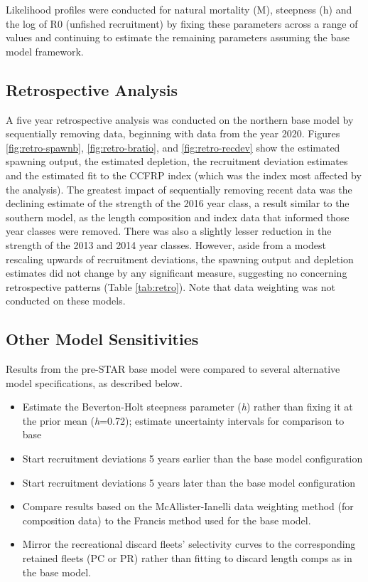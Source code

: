 \documentclass[
  english,
  a4paper,
]{article}
\providecommand{\tightlist}{%
  \setlength{\itemsep}{0pt}\setlength{\parskip}{0pt}}
\begin{document}
Likelihood profiles were conducted for natural mortality (M), steepness (h) and the log of R0 (unfished recruitment) by fixing these parameters across a range of values and continuing to estimate the remaining parameters assuming the base model framework.

\hypertarget{retrospective-analysis}{%
\subsection{Retrospective Analysis}\label{retrospective-analysis}}

A five year retrospective analysis was conducted on the northern base model by sequentially removing data, beginning with data from the year 2020. Figures \ref{fig:retro-spawnb}, \ref{fig:retro-bratio}, and \ref{fig:retro-recdev} show the estimated spawning output, the estimated depletion, the recruitment deviation estimates and the estimated fit to the CCFRP index (which was the index most affected by the analysis). The greatest impact of sequentially removing recent data was the declining estimate of the strength of the 2016 year class, a result similar to the southern model, as the length composition and index data that informed those year classes were removed. There was also a slightly lesser reduction in the strength of the 2013 and 2014 year classes. However, aside from a modest rescaling upwards of recruitment deviations, the spawning output and depletion estimates did not change by any significant measure, suggesting no concerning retrospective patterns (Table \ref{tab:retro}). Note that data weighting was not conducted on these models.

\hypertarget{other-model-sensitivities}{%
\subsection{Other Model Sensitivities}\label{other-model-sensitivities}}

Results from the pre-STAR base model were compared to several alternative model specifications, as described below.

\begin{itemize}
\tightlist
\item
  Estimate the Beverton-Holt steepness parameter (\emph{h}) rather than fixing it at the prior mean (\emph{h}=0.72); estimate uncertainty intervals for comparison to base
\item
  Start recruitment deviations 5 years earlier than the base model configuration
\item
  Start recruitment deviations 5 years later than the base model configuration
\item
  Compare results based on the McAllister-Ianelli data weighting method (for composition data) to the Francis method used for the base model.
\item
  Mirror the recreational discard fleets' selectivity curves to the corresponding retained fleets (PC or PR) rather than fitting to discard length comps as in the base model.
\end{itemize}
\end{document}

